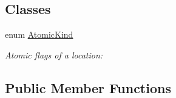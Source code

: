 \subsection*{Classes}
\begin{DoxyCompactItemize}
\item 
enum \hyperlink{enumedu_1_1udel_1_1cis_1_1vsl_1_1civl_1_1model_1_1IF_1_1location_1_1Location_1_1AtomicKind}{Atomic\+Kind}
\begin{DoxyCompactList}\small\item\em Atomic flags of a location\+: \end{DoxyCompactList}\end{DoxyCompactItemize}
\subsection*{Public Member Functions}
